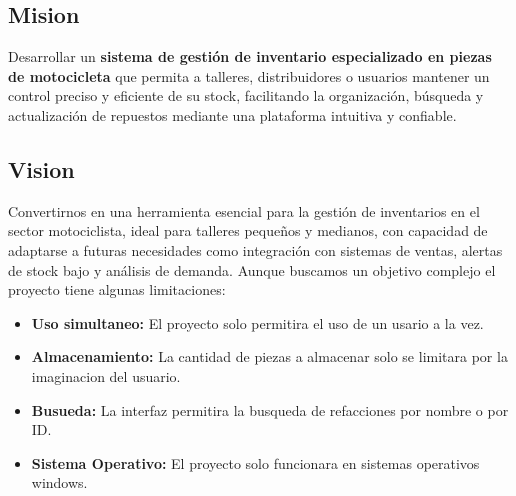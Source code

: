 \subsection*{\centering Mision}
Desarrollar un \textbf{sistema de gestión de inventario especializado en piezas de motocicleta} que permita a talleres,
distribuidores o usuarios mantener un control preciso y eficiente de su stock, 
facilitando la organización, búsqueda y actualización de repuestos mediante una 
plataforma intuitiva y confiable.

\subsection*{\centering Vision}
Convertirnos en una herramienta esencial para la gestión de inventarios en el sector 
motociclista, ideal para talleres pequeños y medianos, 
con capacidad de adaptarse a futuras necesidades como integración con 
sistemas de ventas, alertas de stock bajo y análisis de demanda.
\newline
\newline
Aunque buscamos un objetivo complejo el proyecto tiene algunas limitaciones:

\begin{itemize}
    \item \textbf{Uso simultaneo:} El proyecto solo permitira el uso de un usario a la vez.
    \item \textbf{Almacenamiento:} La cantidad de piezas a almacenar solo se limitara por la imaginacion del usuario.
    \item \textbf{Busueda:} La interfaz permitira la busqueda de refacciones por nombre o por ID.
    \item \textbf{Sistema Operativo:} El proyecto solo funcionara en sistemas operativos windows.
\end{itemize}